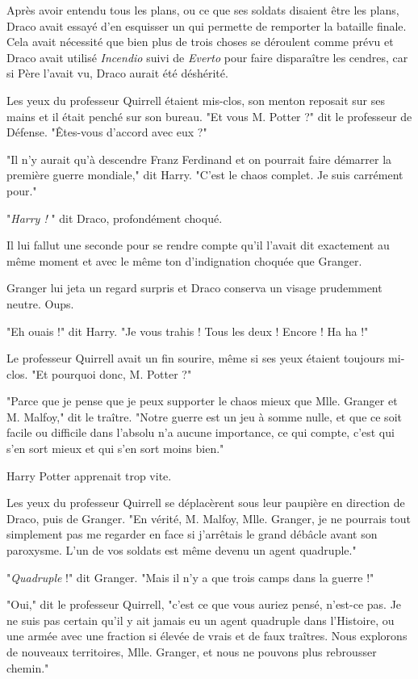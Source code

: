 Après avoir entendu tous les plans, ou ce que ses soldats disaient être les plans, Draco avait essayé d'en esquisser un qui permette de remporter la bataille finale. Cela avait nécessité que bien plus de trois choses se déroulent comme prévu et Draco avait utilisé \emph{Incendio}  suivi de \emph{Everto}  pour faire disparaître les cendres, car si Père l'avait vu, Draco aurait été déshérité.

Les yeux du professeur Quirrell étaient mis-clos, son menton reposait sur ses mains et il était penché sur son bureau. "Et vous M. Potter ?" dit le professeur de Défense. "Êtes-vous d'accord avec eux ?"

"Il n'y aurait qu'à descendre Franz Ferdinand et on pourrait faire démarrer la première guerre mondiale," dit Harry. "C'est le chaos complet. Je suis carrément pour."

"\emph{Harry !} " dit Draco, profondément choqué.

Il lui fallut une seconde pour se rendre compte qu'il l'avait dit exactement au même moment et avec le même ton d'indignation choquée que Granger.

Granger lui jeta un regard surpris et Draco conserva un visage prudemment neutre. Oups.

"Eh ouais !" dit Harry. "Je vous trahis ! Tous les deux ! Encore ! Ha ha !"

Le professeur Quirrell avait un fin sourire, même si ses yeux étaient toujours mi-clos. "Et pourquoi donc, M. Potter ?"

"Parce que je pense que je peux supporter le chaos mieux que Mlle. Granger et M. Malfoy," dit le traître. "Notre guerre est un jeu à somme nulle, et que ce soit facile ou difficile dans l'absolu n'a aucune importance, ce qui compte, c'est qui s'en sort mieux et qui s'en sort moins bien."

Harry Potter apprenait trop vite.

Les yeux du professeur Quirrell se déplacèrent sous leur paupière en direction de Draco, puis de Granger. "En vérité, M. Malfoy, Mlle. Granger, je ne pourrais tout simplement pas me regarder en face si j'arrêtais le grand débâcle avant son paroxysme. L'un de vos soldats est même devenu un agent quadruple."

"\emph{Quadruple}  !" dit Granger. "Mais il n'y a que trois camps dans la guerre !"

"Oui," dit le professeur Quirrell, "c'est ce que vous auriez pensé, n'est-ce pas. Je ne suis pas certain qu'il y ait jamais eu un agent quadruple dans l'Histoire, ou une armée avec une fraction si élevée de vrais et de faux traîtres. Nous explorons de nouveaux territoires, Mlle. Granger, et nous ne pouvons plus rebrousser chemin."

